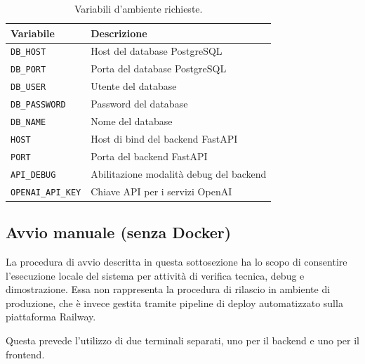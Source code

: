 \documentclass[a4paper, 11pt, oneside]{scrartcl}
\begin{document}
\begin{table}[H]
    \centering
    \renewcommand{\arraystretch}{1.2}
    \begin{tabularx}{\textwidth}{@{}p{4.5cm}X@{}}
        \toprule
        \textbf{Variabile}        & \textbf{Descrizione}                      \\
        \midrule
        \texttt{DB\_HOST}         & Host del database PostgreSQL              \\
        \texttt{DB\_PORT}         & Porta del database PostgreSQL             \\
        \texttt{DB\_USER}         & Utente del database                       \\
        \texttt{DB\_PASSWORD}     & Password del database                     \\
        \texttt{DB\_NAME}         & Nome del database                         \\
        \texttt{HOST}             & Host di bind del backend FastAPI          \\
        \texttt{PORT}             & Porta del backend FastAPI                 \\
        \texttt{API\_DEBUG}       & Abilitazione modalit\`a debug del backend \\
        \texttt{OPENAI\_API\_KEY} & Chiave API per i servizi OpenAI           \\
        \bottomrule
    \end{tabularx}
    \caption{Variabili d'ambiente richieste.}
\end{table}

\subsection{Avvio manuale (senza Docker)}

La procedura di avvio descritta in questa sottosezione ha lo scopo di consentire l'esecuzione locale del sistema per attivit\`a di verifica tecnica, debug e dimostrazione. Essa non rappresenta la procedura di rilascio in ambiente di produzione, che \`e invece gestita tramite pipeline di deploy automatizzato sulla piattaforma Railway.

Questa prevede l'utilizzo di due terminali separati, uno per il backend e uno per il frontend.
\end{document}
